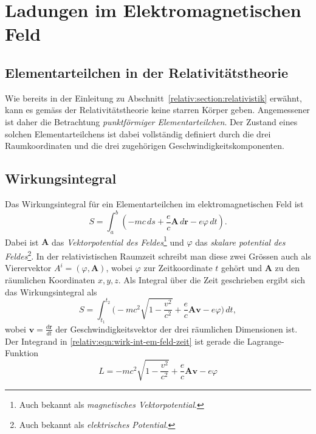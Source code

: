 
\section{Ladungen im Elektromagnetischen Feld
\label{relativ:section:em_feld}}


\subsection{Elementarteilchen in der Relativitätstheorie
\label{relativ:section:elementarteilchen}}

Wie bereits in der Einleitung zu Abschnitt~\ref{relativ:section:relativistik} erwähnt,
kann es gemäss der Relativitätstheorie keine starren Körper geben.
Angemessener ist daher die Betrachtung \emph{punktförmiger Elementarteilchen}.
Der Zustand eines solchen Elementarteilchens ist dabei vollständig definiert durch
die drei Raumkoordinaten und die drei zugehörigen Geschwindigkeitskomponenten.


\subsection{Wirkungsintegral
\label{relativ:section:wirkungsintegral}}

Das Wirkungsintegral für ein Elementarteilchen im elektromagnetischen Feld ist
\begin{equation}
    S = \int_a^b \left(-mc\,ds + \frac{e}{c} \mathbf{A}\,d\mathbf{r} - e\varphi\,dt\right).
    \label{relativ:eqn:wirk-int-em-feld}
\end{equation}
Dabei ist \(\mathbf{A}\) das \emph{Vektorpotential des Feldes}\footnote{
    Auch bekannt als \emph{magnetisches Vektorpotential}.}
und \(\varphi\) das \emph{skalare potential des Feldes}\footnote{
    Auch bekannt als \emph{elektrisches Potential}.}.
In der relativistischen Raumzeit schreibt man diese zwei Grössen
auch als Vierervektor \(A^i = (\varphi, \mathbf{A})\),
wobei \(\varphi\) zur Zeitkoordinate \(t\) gehört und
\(\mathbf{A}\) zu den räumlichen Koordinaten \(x, y, z\).
Als Integral über die Zeit geschrieben ergibt sich das Wirkungsintegral als
\begin{equation}
    S = \int_{t_1}^{t_2} \biggl( -mc^2 \sqrt{1-\frac{v^2}{c^2}} + \frac{e}{c} \mathbf{A} \mathbf{v} - e \varphi \biggr) \, dt,
    \label{relativ:eqn:wirk-int-em-feld-zeit}
\end{equation}
wobei \(\displaystyle \mathbf{v} = \frac{d\mathbf{r}}{dt}\) der Geschwindigkeitsvektor der drei räumlichen Dimensionen ist.
Der Integrand in \eqref{relativ:eqn:wirk-int-em-feld-zeit} ist gerade die Lagrange-Funktion
\begin{equation}
    L = -mc^2 \sqrt{1-\frac{v^2}{c^2}} + \frac{e}{c} \mathbf{A} \mathbf{v} - e \varphi
    \label{relativ:eqn:lagrange-em-feld}
\end{equation}


